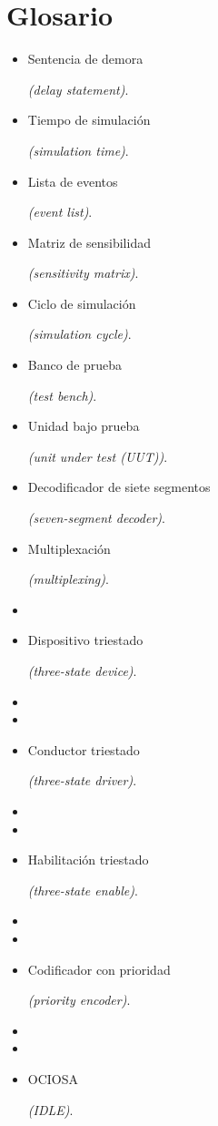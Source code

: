 \section{Glosario}

\begin{itemize}
    \item \hypertarget{delay_statement}{Sentencia de demora} \emph{(delay statement)}.
    \item \hypertarget{simulation_time}{Tiempo de simulación} \emph{(simulation time)}.
    \item \hypertarget{event_list}{Lista de eventos} \emph{(event list)}.
    \item \hypertarget{sensitivity_matrix}{Matriz de sensibilidad} \emph{(sensitivity matrix)}.
    \item \hypertarget{simulation_cycle}{Ciclo de simulación} \emph{(simulation cycle)}.
    \item \hypertarget{test_bench}{Banco de prueba} \emph{(test bench)}.
    \item \hypertarget{unit_under_test}{Unidad bajo prueba} \emph{(unit under test (UUT))}.
    \item \hypertarget{seven-segment_decoder}{Decodificador de siete segmentos} \emph{(seven-segment decoder)}.
    \item \hypertarget{multiplexing}{Multiplexación} \emph{(multiplexing)}.
    \item \item \hypertarget{threestate_device}{Dispositivo triestado} \emph{(three-state device)}.
    \item \item \item \hypertarget{threestate_driver}{Conductor triestado} \emph{(three-state driver)}.
    \item \item \item \hypertarget{threestate_enable}{Habilitación triestado} \emph{(three-state enable)}.
    \item \item \item \hypertarget{priority_encoder}{Codificador con prioridad} \emph{(priority encoder)}.
    \item \item \item \hypertarget{IDLE}{OCIOSA} \emph{(IDLE)}.
\end{itemize}